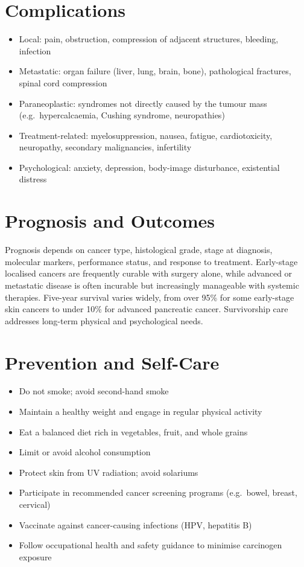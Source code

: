 \section*{Complications}
\begin{itemize}
    \item Local: pain, obstruction, compression of adjacent structures, bleeding, infection
    \item Metastatic: organ failure (liver, lung, brain, bone), pathological fractures, spinal cord compression
    \item Paraneoplastic: syndromes not directly caused by the tumour mass (e.g.\ hypercalcaemia, Cushing syndrome, neuropathies)
    \item Treatment-related: myelosuppression, nausea, fatigue, cardiotoxicity, neuropathy, secondary malignancies, infertility
    \item Psychological: anxiety, depression, body-image disturbance, existential distress
\end{itemize}

\section*{Prognosis and Outcomes}
Prognosis depends on cancer type, histological grade, stage at diagnosis, molecular markers, performance status, and response to treatment. Early-stage localised cancers are frequently curable with surgery alone, while advanced or metastatic disease is often incurable but increasingly manageable with systemic therapies. Five-year survival varies widely, from over 95\% for some early-stage skin cancers to under 10\% for advanced pancreatic cancer. Survivorship care addresses long-term physical and psychological needs.

\section*{Prevention and Self-Care}
\begin{itemize}
    \item Do not smoke; avoid second-hand smoke
    \item Maintain a healthy weight and engage in regular physical activity
    \item Eat a balanced diet rich in vegetables, fruit, and whole grains
    \item Limit or avoid alcohol consumption
    \item Protect skin from UV radiation; avoid solariums
    \item Participate in recommended cancer screening programs (e.g.\ bowel, breast, cervical)
    \item Vaccinate against cancer-causing infections (HPV, hepatitis B)
    \item Follow occupational health and safety guidance to minimise carcinogen exposure
\end{itemize}
